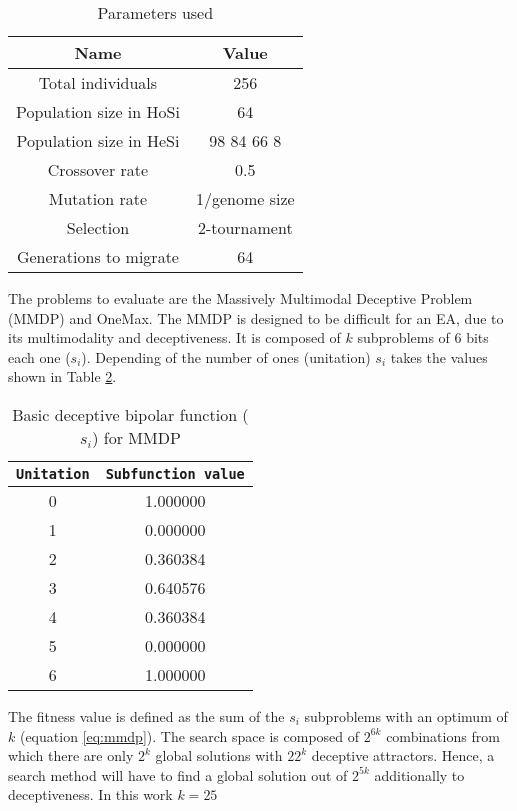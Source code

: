 \documentclass{sig-alternate}
\begin{document}
\begin{table}
\centering
\begin{tabular}{|c|c|} \hline
Name & Value\\ \hline
Total individuals & 256\\ \hline
Population size in HoSi & 64 \\ \hline
Population size in HeSi & 98 84 66 8\\ \hline
Crossover rate & 0.5\\ \hline
Mutation rate & 1/genome size\\ \hline
Selection & 2-tournament \\ \hline
Generations to migrate & 64 \\
\hline\end{tabular}
\label{table:parameters}
\caption{Parameters used}
\end{table}

The problems to evaluate are the Massively Multimodal Deceptive Problem (MMDP) and OneMax. The MMDP
\cite{goldberg92massive} is designed to be difficult for an EA, due to
its multimodality and deceptiveness. It is composed of $k$ subproblems of 6 bits each one ($s_i$). Depending of
the number of ones (unitation) $s_i$ takes the values shown in Table \ref{table:mmdp}.  

\begin{table}[h]

\centering
{\scriptsize
\begin{tabular}{|c|c|}
\hline
\texttt{Unitation}&\texttt{Subfunction value}\\
\hline
0 & 1.000000 \\
\hline
1 & 0.000000 \\
\hline
2 & 0.360384 \\
\hline
3 & 0.640576\\
\hline
4 & 0.360384\\
\hline
5 & 0.000000\\
\hline
6 & 1.000000\\
\hline

\end{tabular}
}
\caption{ Basic deceptive bipolar function ($s_i$) for MMDP
\label{table:mmdp}}
\end{table}



The fitness value is defined as the sum of the $s_i$ subproblems with an optimum of $k$ (equation \ref{eq:mmdp}).
The search space is composed of $2^{6k}$ combinations from which there
are only $2^k$ global solutions with $22^k$ deceptive
attractors. Hence, a search method will have to find a global solution
out of $2^{5k}$ additionally to deceptiveness. In this work $k=25$
\end{document}
